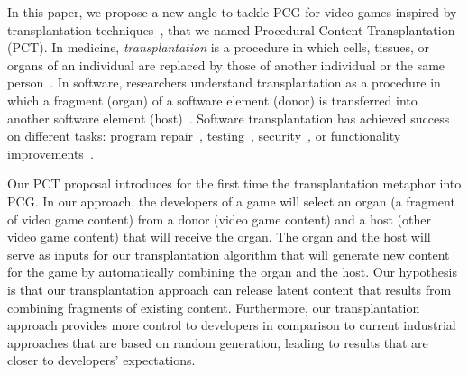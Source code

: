 In this paper, we propose a new angle to tackle PCG for video games inspired by transplantation techniques~\cite{barr2015automated}, that we named Procedural Content Transplantation (PCT). In medicine, \textit{transplantation} is a procedure in which cells, tissues, or organs of an individual are replaced by those of another individual or the same person~\cite{FARSHBAFNADI2023599}. In software, researchers understand transplantation as a procedure in which a fragment (organ) of a software element (donor) is transferred into another software element (host)~\cite{barr2015automated}. Software transplantation has achieved success on different tasks: program repair~\cite{weimer2009automatically,sidiroglou2014automatic}, testing~\cite{zhang2017automated}, security~\cite{yang2017malware}, or functionality improvements~\cite{sidiroglou2017codecarboncopy}.

Our PCT proposal introduces for the first time the transplantation metaphor into PCG. In our approach, the developers of a game will select an organ (a fragment of video game content) from a donor (video game content) and a host (other video game content) that will receive the organ. The organ and the host will serve as inputs for our transplantation algorithm that will generate new content for the game by automatically combining the organ and the host. Our hypothesis is that our transplantation approach can release latent content that results from combining fragments of existing content. Furthermore, our transplantation approach provides more control to developers in comparison to current industrial approaches that are based on random generation, leading to results that are closer to developers' expectations.


